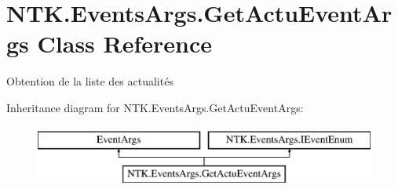 \hypertarget{class_n_t_k_1_1_events_args_1_1_get_actu_event_args}{}\section{N\+T\+K.\+Events\+Args.\+Get\+Actu\+Event\+Args Class Reference}
\label{class_n_t_k_1_1_events_args_1_1_get_actu_event_args}


Obtention de la liste des actualités  


Inheritance diagram for N\+T\+K.\+Events\+Args.\+Get\+Actu\+Event\+Args\+:\begin{figure}[H]
\begin{center}
\leavevmode
\includegraphics[height=2.000000cm]{d0/d91/class_n_t_k_1_1_events_args_1_1_get_actu_event_args}
\end{center}
\end{figure}
